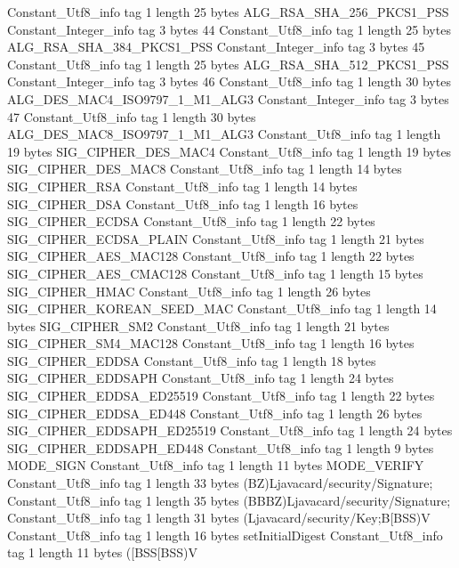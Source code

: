 {{{		}
		Constant_Utf8_info {
			tag	1
			length	25
			bytes	ALG_RSA_SHA_256_PKCS1_PSS
		}
		Constant_Integer_info {
			tag	3
			bytes	44
		}
		Constant_Utf8_info {
			tag	1
			length	25
			bytes	ALG_RSA_SHA_384_PKCS1_PSS
		}
		Constant_Integer_info {
			tag	3
			bytes	45
		}
		Constant_Utf8_info {
			tag	1
			length	25
			bytes	ALG_RSA_SHA_512_PKCS1_PSS
		}
		Constant_Integer_info {
			tag	3
			bytes	46
		}
		Constant_Utf8_info {
			tag	1
			length	30
			bytes	ALG_DES_MAC4_ISO9797_1_M1_ALG3
		}
		Constant_Integer_info {
			tag	3
			bytes	47
		}
		Constant_Utf8_info {
			tag	1
			length	30
			bytes	ALG_DES_MAC8_ISO9797_1_M1_ALG3
		}
		Constant_Utf8_info {
			tag	1
			length	19
			bytes	SIG_CIPHER_DES_MAC4
		}
		Constant_Utf8_info {
			tag	1
			length	19
			bytes	SIG_CIPHER_DES_MAC8
		}
		Constant_Utf8_info {
			tag	1
			length	14
			bytes	SIG_CIPHER_RSA
		}
		Constant_Utf8_info {
			tag	1
			length	14
			bytes	SIG_CIPHER_DSA
		}
		Constant_Utf8_info {
			tag	1
			length	16
			bytes	SIG_CIPHER_ECDSA
		}
		Constant_Utf8_info {
			tag	1
			length	22
			bytes	SIG_CIPHER_ECDSA_PLAIN
		}
		Constant_Utf8_info {
			tag	1
			length	21
			bytes	SIG_CIPHER_AES_MAC128
		}
		Constant_Utf8_info {
			tag	1
			length	22
			bytes	SIG_CIPHER_AES_CMAC128
		}
		Constant_Utf8_info {
			tag	1
			length	15
			bytes	SIG_CIPHER_HMAC
		}
		Constant_Utf8_info {
			tag	1
			length	26
			bytes	SIG_CIPHER_KOREAN_SEED_MAC
		}
		Constant_Utf8_info {
			tag	1
			length	14
			bytes	SIG_CIPHER_SM2
		}
		Constant_Utf8_info {
			tag	1
			length	21
			bytes	SIG_CIPHER_SM4_MAC128
		}
		Constant_Utf8_info {
			tag	1
			length	16
			bytes	SIG_CIPHER_EDDSA
		}
		Constant_Utf8_info {
			tag	1
			length	18
			bytes	SIG_CIPHER_EDDSAPH
		}
		Constant_Utf8_info {
			tag	1
			length	24
			bytes	SIG_CIPHER_EDDSA_ED25519
		}
		Constant_Utf8_info {
			tag	1
			length	22
			bytes	SIG_CIPHER_EDDSA_ED448
		}
		Constant_Utf8_info {
			tag	1
			length	26
			bytes	SIG_CIPHER_EDDSAPH_ED25519
		}
		Constant_Utf8_info {
			tag	1
			length	24
			bytes	SIG_CIPHER_EDDSAPH_ED448
		}
		Constant_Utf8_info {
			tag	1
			length	9
			bytes	MODE_SIGN
		}
		Constant_Utf8_info {
			tag	1
			length	11
			bytes	MODE_VERIFY
		}
		Constant_Utf8_info {
			tag	1
			length	33
			bytes	(BZ)Ljavacard/security/Signature;
		}
		Constant_Utf8_info {
			tag	1
			length	35
			bytes	(BBBZ)Ljavacard/security/Signature;
		}
		Constant_Utf8_info {
			tag	1
			length	31
			bytes	(Ljavacard/security/Key;B[BSS)V
		}
		Constant_Utf8_info {
			tag	1
			length	16
			bytes	setInitialDigest
		}
		Constant_Utf8_info {
			tag	1
			length	11
			bytes	([BSS[BSS)V
}}}
